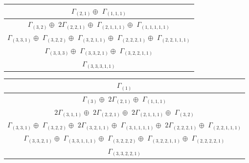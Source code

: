 \documentclass[main.tex]{subfiles}
\begin{document}
\begin{minipage}{.6\textwidth}
\centering
\begin{tabular}{c}
$\Gamma_{(
2 , 
1
)} \oplus$
$\Gamma_{(
1 , 
1 , 
1
)}$
\\ \hline
$\Gamma_{(
3 , 
2
)} \oplus$
$2\Gamma_{(
2 , 
2 , 
1
)} \oplus$
$\Gamma_{(
2 , 
1 , 
1 , 
1
)} \oplus$
$\Gamma_{(
1 , 
1 , 
1 , 
1 , 
1
)}$
\\ \hline
$\Gamma_{(
3 , 
3 , 
1
)} \oplus$
$\Gamma_{(
3 , 
2 , 
2
)} \oplus$
$\Gamma_{(
3 , 
2 , 
1 , 
1
)} \oplus$
$\Gamma_{(
2 , 
2 , 
2 , 
1
)} \oplus$
$\Gamma_{(
2 , 
2 , 
1 , 
1 , 
1
)}$
\\ \hline
$\Gamma_{(
3 , 
3 , 
3
)} \oplus$
$\Gamma_{(
3 , 
3 , 
2 , 
1
)} \oplus$
$\Gamma_{(
3 , 
2 , 
2 , 
1 , 
1
)}$
\\ \hline
$\Gamma_{(
3 , 
3 , 
3 , 
1 , 
1
)}$
\\
\end{tabular}\end{minipage}
\bigskip
\begin{minipage}{1\textwidth}
\centering
\begin{tabular}{c}
$\Gamma_{(
1
)}$
\\ \hline
$\Gamma_{(
3
)} \oplus$
$2\Gamma_{(
2 , 
1
)} \oplus$
$\Gamma_{(
1 , 
1 , 
1
)}$
\\ \hline
$2\Gamma_{(
3 , 
1 , 
1
)} \oplus$
$2\Gamma_{(
2 , 
2 , 
1
)} \oplus$
$2\Gamma_{(
2 , 
1 , 
1 , 
1
)} \oplus$
$\Gamma_{(
3 , 
2
)}$
\\ \hline
$\Gamma_{(
3 , 
3 , 
1
)} \oplus$
$\Gamma_{(
3 , 
2 , 
2
)} \oplus$
$2\Gamma_{(
3 , 
2 , 
1 , 
1
)} \oplus$
$\Gamma_{(
3 , 
1 , 
1 , 
1 , 
1
)} \oplus$
$2\Gamma_{(
2 , 
2 , 
2 , 
1
)} \oplus$
$\Gamma_{(
2 , 
2 , 
1 , 
1 , 
1
)}$
\\ \hline
$\Gamma_{(
3 , 
3 , 
2 , 
1
)} \oplus$
$\Gamma_{(
3 , 
3 , 
1 , 
1 , 
1
)} \oplus$
$\Gamma_{(
3 , 
2 , 
2 , 
2
)} \oplus$
$\Gamma_{(
3 , 
2 , 
2 , 
1 , 
1
)} \oplus$
$\Gamma_{(
2 , 
2 , 
2 , 
2 , 
1
)}$
\\ \hline
$\Gamma_{(
3 , 
3 , 
2 , 
2 , 
1
)}$
\\
\end{tabular}\end{minipage}
\bigskip
\end{document}

